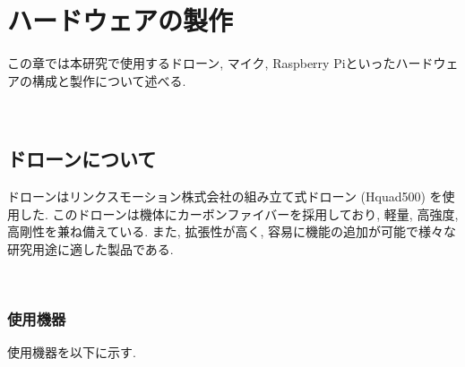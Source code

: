 \chapter{ハードウェアの製作}\label{hardware}

この章では本研究で使用するドローン, マイク, Raspberry
Piといったハードウェアの構成と製作について述べる. 

\
\section{ドローンについて}\label{about-drone}

ドローンはリンクスモーション株式会社の組み立て式ドローン (Hquad500)
を使用した. このドローンは機体にカーボンファイバーを採用しており, 軽量, 高強度, 高剛性を兼ね備えている. また, 拡張性が高く, 容易に機能の追加が可能で様々な研究用途に適した製品である. 

\
\subsection{使用機器}\label{used-equipments-drone}

使用機器を以下に示す. 

